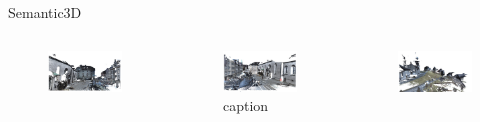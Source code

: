 \documentclass[aspectratio=169]{beamer}
\begin{document}
\begin{frame}{Semantic3D}
    \begin{columns}
        \begin{column}{0.33\textwidth}
            \begin{figure}
                \centering
                \includegraphics[scale=0.33]{images/sem3d/sem3d_sample_1.jpg}
            \end{figure}
        \end{column}
        \begin{column}{0.33\textwidth}
            \begin{figure}
                \centering
                \includegraphics[scale=0.33]{images/sem3d/sem3d_sample_2.jpg}
                \caption{caption}
                \label{fig:sem3d_sample_2}    
            \end{figure}
        \end{column}
        \begin{column}{0.33\textwidth}
            \begin{figure}
                \centering
                \includegraphics[scale=0.33]{images/sem3d/sem3d_sample_3.jpg}

\end{figure}
\end{column}
\end{columns}
\end{frame}
\end{document}
